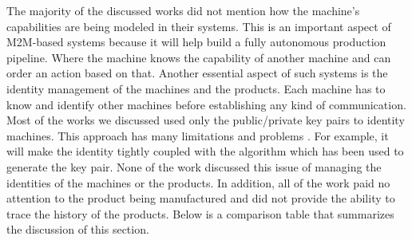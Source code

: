 \documentclass[runningheads]{llncs}
\begin{document}
\noindent The majority of the discussed works did not mention how the machine's capabilities are being modeled in their systems. This is an important aspect of M2M-based systems because it will help build a fully autonomous production pipeline. Where the machine knows the capability of another machine and can order an action based on that. Another essential aspect of such systems is the identity management of the machines and the products. Each machine has to know and identify other machines before establishing any kind of communication.  Most of the works we discussed used only the public/private key pairs to identity machines. This approach has many limitations and problems \cite{Zhu2018}. For example, it will make the identity tightly coupled with the algorithm which has been used to generate the key pair. None of the work discussed this issue of managing the identities of the machines or the products. In addition, all of the work paid no attention to the product being manufactured and did not provide the ability to trace the history of the products. Below is a comparison table that summarizes the discussion of this section.
\end{document}
